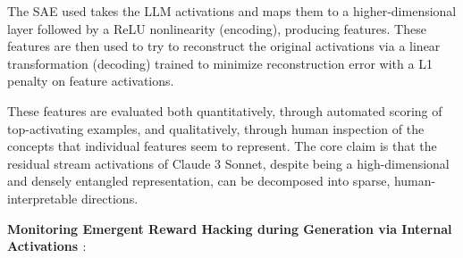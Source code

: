 \documentclass[11pt]{article}
\begin{document}
\vspace{2mm}
The SAE used takes the LLM activations and maps them to a higher-dimensional layer followed by a ReLU nonlinearity (encoding), producing features.  These features are then used to try to reconstruct the original activations via a linear transformation (decoding) trained to minimize reconstruction error with a L1 penalty on feature activations. 

\vspace{2mm}
These features are evaluated both quantitatively, through automated scoring of top-activating examples, and qualitatively, through human inspection of the concepts that individual features seem to represent. The core claim is that the residual stream activations of Claude 3 Sonnet, despite being a high-dimensional and densely entangled representation, can be decomposed into sparse, human-interpretable directions.

\bigskip
\textbf{Monitoring Emergent Reward Hacking during Generation via Internal Activations \citep{Wilhelm2026Monitoring}}: 




\end{document}

